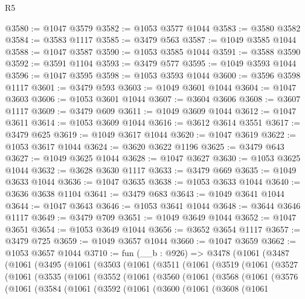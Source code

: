 \begin{lexlean}{R5}
\begin{coremodule}
@3580 := @1047 @3579
@3582 := @1053 @3577 @1044
@3583 := @3580 @3582
@3584 := @3583 @1117
@3585 := @3479 @563
@3587 := @1049 @3585 @1044
@3588 := @1047 @3587
@3590 := @1053 @3585 @1044
@3591 := @3588 @3590
@3592 := @3591 @1104
@3593 := @3479 @577
@3595 := @1049 @3593 @1044
@3596 := @1047 @3595
@3598 := @1053 @3593 @1044
@3600 := @3596 @3598 @1117
@3601 := @3479 @593
@3603 := @1049 @3601 @1044
@3604 := @1047 @3603
@3606 := @1053 @3601 @1044
@3607 := @3604 @3606
@3608 := @3607 @1117
@3609 := @3479 @609
@3611 := @1049 @3609 @1044
@3612 := @1047 @3611
@3614 := @1053 @3609 @1044
@3616 := @3612 @3614 @3551
@3617 := @3479 @625
@3619 := @1049 @3617 @1044
@3620 := @1047 @3619
@3622 := @1053 @3617 @1044
@3624 := @3620 @3622 @1196
@3625 := @3479 @643
@3627 := @1049 @3625 @1044
@3628 := @1047 @3627
@3630 := @1053 @3625 @1044
@3632 := @3628 @3630 @1117
@3633 := @3479 @669
@3635 := @1049 @3633 @1044
@3636 := @1047 @3635
@3638 := @1053 @3633 @1044
@3640 := @3636 @3638 @1104
@3641 := @3479 @683
@3643 := @1049 @3641 @1044
@3644 := @1047 @3643
@3646 := @1053 @3641 @1044
@3648 := @3644 @3646 @1117
@3649 := @3479 @709
@3651 := @1049 @3649 @1044
@3652 := @1047 @3651
@3654 := @1053 @3649 @1044
@3656 := @3652 @3654 @1117
@3657 := @3479 @725
@3659 := @1049 @3657 @1044
@3660 := @1047 @3659
@3662 := @1053 @3657 @1044
@3710 := fun (__b : @926) =>
  @3478
    (@1061
      (@3487
        (@1061
          (@3495
            (@1061
              (@3503
                (@1061
                  (@3511
                    (@1061
                      (@3519
                        (@1061
                          (@3527
                            (@1061
                              (@3535
                                (@1061
                                  (@3552
                                    (@1061
                                      (@3560
                                        (@1061
                                          (@3568
                                            (@1061
                                              (@3576
                                                (@1061
                                                  (@3584
                                                    (@1061
                                                      (@3592
                                                        (@1061
                                                          (@3600
                                                            (@1061
                                                              (@3608
                                                                (@1061

\end{coremodule}
\end{lexlean}
